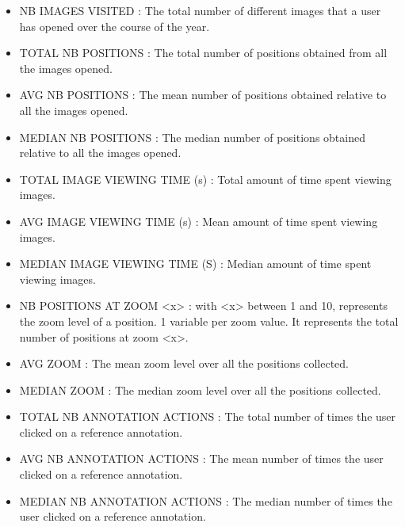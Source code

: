 \documentclass[a4paper,11pt]{report}
\numberwithin{figure}{section} %
\begin{document}
   \begin{itemize}
    \item[\textbullet] NB IMAGES VISITED : The total number of different images that a user has opened over the course of the year.\\
    \item[\textbullet] TOTAL NB POSITIONS : The total number of positions obtained from all the images opened.\\
    \item[\textbullet] AVG NB POSITIONS : The mean number of positions obtained relative to all the images opened.\\
    
    \item[\textbullet] MEDIAN NB POSITIONS : The median number of positions  obtained relative to all the images opened.\\
    \item[\textbullet] TOTAL IMAGE VIEWING TIME (s) : Total amount of time spent viewing images.\\

    \item[\textbullet] AVG IMAGE VIEWING TIME (s) : Mean amount of time spent viewing images.\\

    \item[\textbullet] MEDIAN IMAGE VIEWING TIME (S) : Median amount of time spent viewing images.\\

    \item[\textbullet] NB POSITIONS AT ZOOM <x> : with <x> between 1 and 10, represents the zoom level of a position.
    1 variable per zoom value.
    It represents the total number of positions at zoom <x>.\\
    \item[\textbullet] AVG ZOOM : The mean zoom level over all the positions collected.\\
    \item[\textbullet] MEDIAN ZOOM : The median zoom level over all the positions collected.\\
    \item[\textbullet] TOTAL NB ANNOTATION ACTIONS : The total number of times the user clicked on a reference annotation.\\
    \item[\textbullet] AVG NB ANNOTATION ACTIONS : The mean number of times the user clicked on a reference annotation.\\
    \item[\textbullet] MEDIAN NB ANNOTATION ACTIONS : The median number of times the user clicked on a reference annotation.\\
    

\end{itemize}
\end{document}
